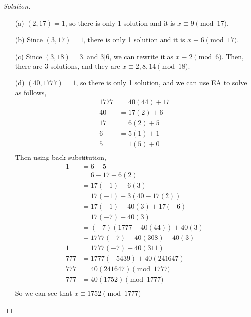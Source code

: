 \documentclass[11pt]{article}
\newenvironment{solution}
  {\renewcommand\qedsymbol{$~$}\begin{proof}[Solution]$ $\par\nobreak\ignorespaces}
  {\end{proof}}
\begin{document}
\begin{solution}
  \begin{itemize}
    \item [(a)] $(2,17)=1$, so there is only 1 solution and it is $x\equiv9\pmod{17}$.
    \item [(b)] Since $(3,17)=1$, there is only 1 solution and it is $x\equiv6\pmod{17}$.
    \item [(c)] Since $(3,18)=3$, and $3|6$, we can rewrite it as $x\equiv 2 \pmod{6}$. Then, there are 3 solutions, and they are $x\equiv 2, 8, 14 \pmod{18}$.
    \item [(d)] $(40,1777)=1$, so there is only 1 solution, and we can use EA to solve as follows,
          \begin{align*}
            1777 & = 40(44)+17 \\
            40   & = 17(2) + 6 \\
            17   & = 6(2) + 5  \\
            6    & = 5(1) + 1  \\
            5    & = 1(5)+0    \\
          \end{align*}
          Then using back substitution,
          \begin{align*}
            1   & = 6 - 5                      \\
                & = 6 - 17+6(2)                \\
                & = 17(-1) + 6(3)              \\
                & = 17(-1) + 3(40-17(2))       \\
                & = 17(-1) + 40(3) + 17(-6)    \\
                & = 17(-7) + 40(3)             \\
                & = (-7)(1777-40(44)) + 40(3)  \\
                & = 1777(-7) + 40(308) + 40(3) \\
            1   & = 1777(-7) + 40(311)         \\
            777 & = 1777(-5439) +40(241647)    \\
            777 & = 40(241647) \pmod{1777}     \\
            777 & = 40(1752) \pmod{1777}       \\
          \end{align*}
          So we can see that $x\equiv 1752\pmod{1777}$
  \end{itemize}
\end{solution}
\end{document}
